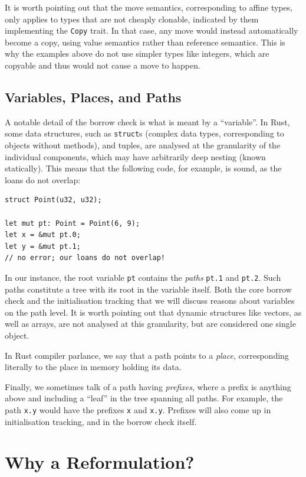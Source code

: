 \documentclass[11pt,a4paper,twoside,openany]{report}
\newcommand{\InRust}[1]{\texttt{#1}}
\begin{document}
It is worth pointing out that the move semantics, corresponding to affine types,
only applies to types that are not cheaply clonable, indicated by them
implementing the \InRust{Copy} trait. In that case, any move would instead
automatically become a copy, using value semantics rather than reference
semantics. This is why the examples above do not use simpler types like
integers, which are copyable and thus would not cause a move to happen.

\subsection{Variables, Places, and Paths}
\label{sec:vars-places-paths}

A notable detail of the borrow check is what is meant by a ``variable''. In
Rust, some data structures, such as \InRust{struct}s (complex data types,
corresponding to objects without methods), and tuples, are analysed at the
granularity of the individual components, which may have arbitrarily deep
nesting (known statically). This means that the following code, for example, is
sound, as the loans do not overlap:
\begin{verbatim}
struct Point(u32, u32);

let mut pt: Point = Point(6, 9);
let x = &mut pt.0;
let y = &mut pt.1;
// no error; our loans do not overlap!
\end{verbatim}

In our instance, the root variable \InRust{pt} contains the \emph{paths}
\InRust{pt.1} and \InRust{pt.2}. Such paths constitute a tree with its root in
the variable itself. Both the core borrow check and the initialisation tracking
that we will discuss reasons about variables on the path level. It is worth
pointing out that dynamic structures like vectors, as well as arrays, are not
analysed at this granularity, but are considered one single object.

In Rust compiler parlance, we say that a path points to a \emph{place},
corresponding literally to the place in memory holding its data.

Finally, we sometimes talk of a path having \emph{prefixes}, where a prefix is
anything above and including a ``leaf'' in the tree spanning all paths. For
example, the path \InRust{x.y} would have the prefixes \InRust{x} and
\InRust{x.y}. Prefixes will also come up in initialisation tracking, and in the
borrow check itself.

\section{Why a Reformulation?}
\label{sec:background:why}
\end{document}
